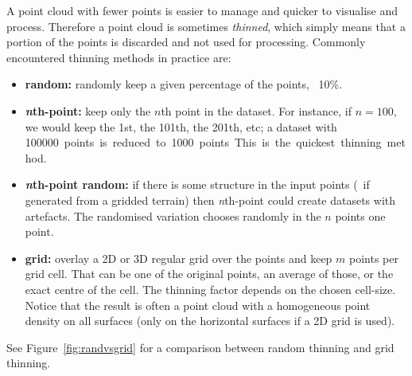 A point cloud with fewer points is easier to manage and quicker to visualise and process.
Therefore a point cloud is sometimes \emph{thinned}, which simply means that a portion of the points is discarded and not used for processing.
Commonly encountered thinning methods in practice are:
\begin{itemize}
  \item \textbf{random:} randomly keep a given percentage of the points, \eg\ 10\%.
  \item \textbf{\emph{n}th-point:} keep only the $n$th point in the dataset. For instance, if $n=100$, we would keep the 1st, the 101th, the 201th, etc; a dataset with \qty{100000} points is reduced to \qty{1000} points. This is the quickest thinning method.
  \item \textbf{\emph{n}th-point random:} if there is some structure in the input points (\eg\ if generated from a gridded terrain) then \emph{n}th-point could create datasets with artefacts. The randomised variation chooses randomly in the $n$ points one point.
  \item \textbf{grid: }overlay a 2D or 3D regular grid over the points and keep $m$ points per grid cell. That can be one of the original points, an average of those, or the exact centre of the cell. The thinning factor depends on the chosen cell-size. Notice that the result is often a point cloud with a homogeneous point density on all surfaces (only on the horizontal surfaces if a 2D grid is used).
\end{itemize}
See Figure~\ref{fig:randvsgrid} for a comparison between random thinning and grid thinning.
